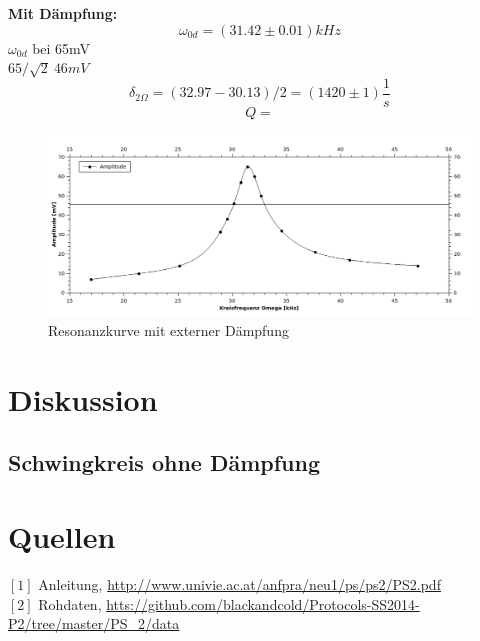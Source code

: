 \documentclass[12pt,a4paper]{article}
\begin{document}
\begin{multicols}{2}


\textbf{Mit Dämpfung:}\\
$$\omega_{0d} = (31.42 \pm 0.01) kHz$$
$\omega_{0d}$ bei 65mV\\
$65 / \sqrt{2} ~ 46mV$\\
$$\delta_{2 \Omega} = (32.97 - 30.13)/2 = (1420 \pm 1)  \frac{1}{s}$$
$$Q = $$ %

\end{multicols}
\begin{figure}[H]
	\centering
	\includegraphics[scale=1.2]{./figure/resonanz_mit_ext_daempf.png}
	\caption{Resonanzkurve mit externer Dämpfung}
	\label{fig:resonanz_mit}
\end{figure}
\begin{multicols}{2}


\pagebreak
\section{Diskussion}


%

\subsection{Schwingkreis ohne Dämpfung}



\section{Quellen}
$[1]$ Anleitung, \url{http://www.univie.ac.at/anfpra/neu1/ps/ps2/PS2.pdf}\\
$[2]$ Rohdaten, \url{htts://github.com/blackandcold/Protocols-SS2014-P2/tree/master/PS_2/data}\\

\end{multicols}
\end{document}
